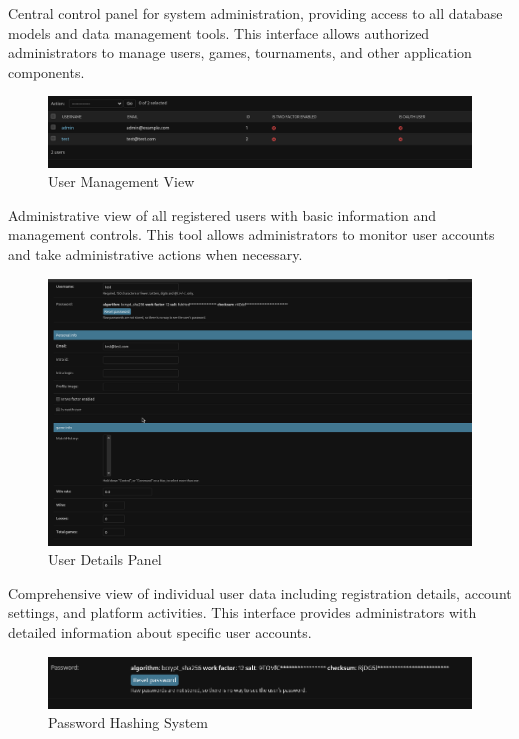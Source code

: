 \begin{appendices}
    \noindent Central control panel for system administration, providing access to all database models and data management tools. This interface allows authorized administrators to manage users, games, tournaments, and other application components.

    \begin{figure}[H]
        \centering
        \includegraphics[width=0.65\linewidth]{Figures/appendix/ListedUsers.png}
        \caption*{User Management View}
        \label{fig:listed-users}
    \end{figure}
    
    \noindent Administrative view of all registered users with basic information and management controls. This tool allows administrators to monitor user accounts and take administrative actions when necessary.

    \begin{figure}[H]
        \centering
        \includegraphics[width=0.7\linewidth]{Figures/appendix/UserDetailsInDjangoAdmin.png}
        \caption*{User Details Panel}
        \label{fig:user-details}
    \end{figure}
    
    \noindent Comprehensive view of individual user data including registration details, account settings, and platform activities. This interface provides administrators with detailed information about specific user accounts.

    \begin{figure}[H]
        \centering
        \includegraphics[width=0.6\linewidth]{Figures/appendix/PassewordIsHashed.png}
        \caption*{Password Hashing System}
        \label{fig:password-hashing}
    \end{figure}
    

\end{appendices}
